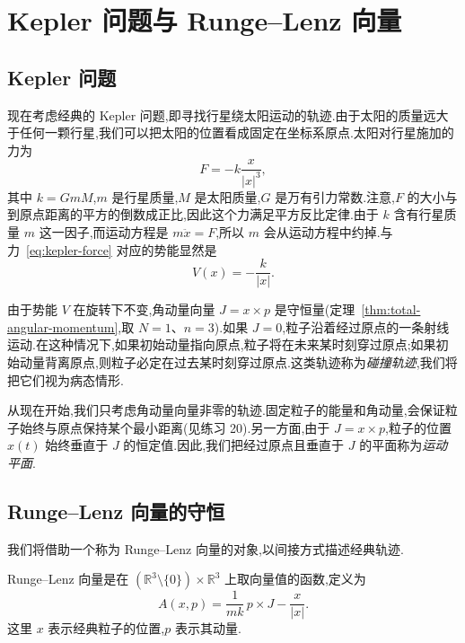 \section{Kepler 问题与 Runge--Lenz 向量}\label{sec:kepler-problem}

\subsection{Kepler 问题}\label{subsec:kepler-problem}

现在考虑经典的 Kepler 问题,即寻找行星绕太阳运动的轨迹.由于太阳的质量远大于任何一颗行星,我们可以把太阳的位置看成固定在坐标系原点.太阳对行星施加的力为
\begin{equation}
  F=-k\frac{x}{\lvert x\rvert^{3}},
  \label{eq:kepler-force}
\end{equation}
其中 $k=GmM$,$m$ 是行星质量,$M$ 是太阳质量,$G$ 是万有引力常数.注意,$F$ 的大小与到原点距离的平方的倒数成正比,因此这个力满足平方反比定律.由于 $k$ 含有行星质量 $m$ 这一因子,而运动方程是 $m\ddot{x}=F$,所以 $m$ 会从运动方程中约掉.与力~\eqref{eq:kepler-force} 对应的势能显然是
\begin{equation}
  V(x)=-\frac{k}{\lvert x\rvert}.
  \label{eq:kepler-potential}
\end{equation}

由于势能 $V$ 在旋转下不变,角动量向量 $J=x\times p$ 是守恒量(定理~\ref{thm:total-angular-momentum},取 $N=1$、$n=3$).如果 $J=0$,粒子沿着经过原点的一条射线运动.在这种情况下,如果初始动量指向原点,粒子将在未来某时刻穿过原点;如果初始动量背离原点,则粒子必定在过去某时刻穿过原点.这类轨迹称为\emph{碰撞轨迹},我们将把它们视为病态情形.

从现在开始,我们只考虑角动量向量非零的轨迹.固定粒子的能量和角动量,会保证粒子始终与原点保持某个最小距离(见练习 20).另一方面,由于 $J=x\times p$,粒子的位置 $x(t)$ 始终垂直于 $J$ 的恒定值.因此,我们把经过原点且垂直于 $J$ 的平面称为\emph{运动平面}.

\subsection{Runge--Lenz 向量的守恒}

我们将借助一个称为 Runge--Lenz 向量的对象,以间接方式描述经典轨迹.

\begin{definition}\label{def:runge-lenz-vector}
Runge--Lenz 向量是在 $(\mathbb{R}^{3}\setminus\{0\})\times\mathbb{R}^{3}$ 上取向量值的函数,定义为
\begin{equation}
  A(x,p)=\frac{1}{mk}\,p\times J-\frac{x}{\lvert x\rvert}.
  \label{eq:runge-lenz-vector}
\end{equation}
这里 $x$ 表示经典粒子的位置,$p$ 表示其动量.
\end{definition}

